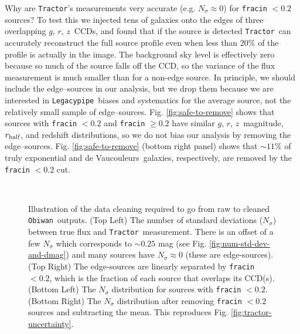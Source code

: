 \documentclass[a4paper,fleqn,usenatbib]{mnras}
\newcommand{\rhalf}{r_{\rm{half}}}
\newcommand{\gb}{$g$}
\newcommand{\rband}{$r$}
\newcommand{\zb}{$z$}
\newcommand{\tractor}{{\tt Tractor}}
\newcommand{\legacypipe}{{\tt Legacypipe}}
\newcommand{\obiwan}{{\tt Obiwan}}
\newcommand{\dev}{de Vaucouleurs}
\begin{document}
Why are \tractor's measurements very accurate (e.g. $N_\sigma \approx 0$) for {\tt{fracin}} $< 0.2$ sources? To test this we injected tens of galaxies onto the edges of three overlapping \gb, \rband, \zb\, CCDs, and found that if the source is detected \tractor\, can accurately reconstruct the full source profile even when less than 20\% of the profile is actually in the image. The background sky level is effectively zero because so much of the source falls off the CCD, so the variance of the flux measurement is much smaller than for a non-edge source. In principle, we should include the edge--sources in our analysis, but we drop them because we are interested in \legacypipe\, biases and systematics for the average source, not the relatively small sample of edge--sources. Fig. \ref{fig:safe-to-remove} shows that sources with {\tt{fracin}} $< 0.2$ and {\tt{fracin}} $\ge 0.2$ have similar \gb, \rband, \zb\, magnitude, $\rhalf$, and redshift distributions, so we do not bias our analysis by removing the edge--sources. Fig. \ref{fig:safe-to-remove} (bottom right panel) shows that $\sim 11$\% of truly exponential and \dev\, galaxies, respectively, are removed by the {\tt{fracin}} $< 0.2$ cut.

\begin{figure}
\begin{center}
     \\
\end{center}
\caption{Illustration of the data cleaning required to go from raw to cleaned \obiwan\, outputs. (Top Left) The number of standard deviations ($N_\sigma$) between true flux and \tractor\, measurement. There is an offset of a few $N_\sigma$ which corresponds to $\sim 0.25$ mag (see Fig. \ref{fig:num-std-dev-and-dmag}) and many sources have $N_\sigma \approx 0$ (these are edge-sources). (Top Right) The edge-sources are linearly separated by {\tt{fracin}} $< 0.2$, which is the fraction of each source that overlaps its CCD(s). (Bottom Left) The $N_\sigma$ distribution for sources with {\tt{fracin}} $< 0.2$. (Bottom Right) The $N_\sigma$ distribution after removing {\tt{fracin}} $< 0.2$ sources and subtracting the mean. This reproduces Fig. \ref{fig:tractor-uncertainty}.}
\label{fig:dflux-systematic}
\end{figure}
\end{document}
